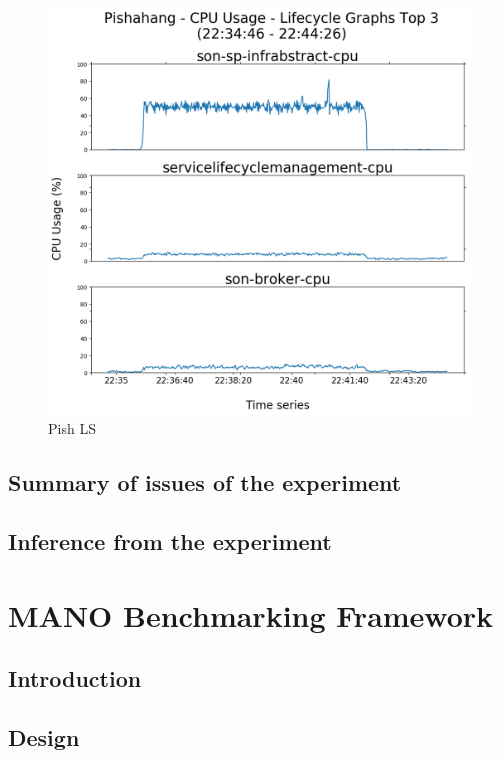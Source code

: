 \begin{figure}[h]
	\centering
	\includegraphics[width=0.7\linewidth]{figures/scalability_graphs/Lifecycle-Graphs-Top-3/Pishahang-TOP-3-Lifecycle}
	\caption{Pish LS}
	\label{fig:pishahang-top-3-lifecycle}
\end{figure}

\subsection{Summary of issues of the experiment}
	
\subsection{Inference from the experiment} 

\section{MANO Benchmarking Framework} 

\subsection{Introduction}

\subsection{Design}

